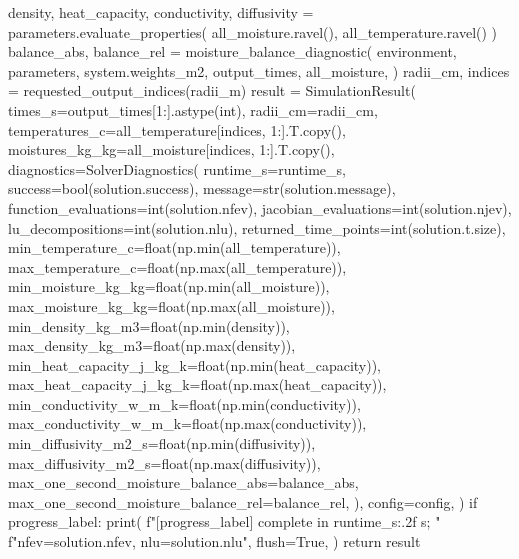 \documentclass[withoutpreface,bwprint]{cumcmthesis}
\begin{document}
\begin{PythonCode}
    density, heat_capacity, conductivity, diffusivity = parameters.evaluate_properties(
        all_moisture.ravel(), all_temperature.ravel()
    )
    balance_abs, balance_rel = moisture_balance_diagnostic(
        environment,
        parameters,
        system.weights_m2,
        output_times,
        all_moisture,
    )
    radii_cm, indices = requested_output_indices(radii_m)
    result = SimulationResult(
        times_s=output_times[1:].astype(int),
        radii_cm=radii_cm,
        temperatures_c=all_temperature[indices, 1:].T.copy(),
        moistures_kg_kg=all_moisture[indices, 1:].T.copy(),
        diagnostics=SolverDiagnostics(
            runtime_s=runtime_s,
            success=bool(solution.success),
            message=str(solution.message),
            function_evaluations=int(solution.nfev),
            jacobian_evaluations=int(solution.njev),
            lu_decompositions=int(solution.nlu),
            returned_time_points=int(solution.t.size),
            min_temperature_c=float(np.min(all_temperature)),
            max_temperature_c=float(np.max(all_temperature)),
            min_moisture_kg_kg=float(np.min(all_moisture)),
            max_moisture_kg_kg=float(np.max(all_moisture)),
            min_density_kg_m3=float(np.min(density)),
            max_density_kg_m3=float(np.max(density)),
            min_heat_capacity_j_kg_k=float(np.min(heat_capacity)),
            max_heat_capacity_j_kg_k=float(np.max(heat_capacity)),
            min_conductivity_w_m_k=float(np.min(conductivity)),
            max_conductivity_w_m_k=float(np.max(conductivity)),
            min_diffusivity_m2_s=float(np.min(diffusivity)),
            max_diffusivity_m2_s=float(np.max(diffusivity)),
            max_one_second_moisture_balance_abs=balance_abs,
            max_one_second_moisture_balance_rel=balance_rel,
        ),
        config=config,
    )
    if progress_label:
        print(
            f"[{progress_label}] complete in {runtime_s:.2f} s; "
            f"nfev={solution.nfev}, nlu={solution.nlu}",
            flush=True,
        )
    return result
\end{PythonCode}
\end{document}
